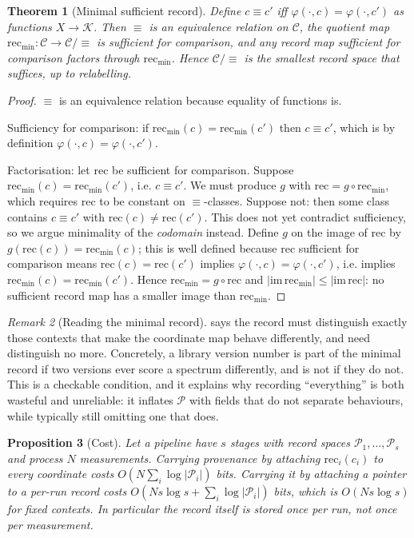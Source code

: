 \documentclass[11pt,a4paper]{article}
\newtheorem{theorem}{Theorem}[section]
\newtheorem{proposition}[theorem]{Proposition}
\theoremstyle{definition}
\theoremstyle{remark}
\newtheorem{remark}[theorem]{Remark}
\newcommand{\Crd}{\mathcal{K}}               %
\newcommand{\Ctx}{\mathcal{C}}               %
\newcommand{\Prv}{\mathcal{P}}               %
\newcommand{\rec}{\mathrm{rec}}
\begin{document}
\begin{theorem}[Minimal sufficient record]\label{thm:minimal-record}
Define $c \equiv c'$ iff $\varphi(\cdot,c) = \varphi(\cdot,c')$ as
functions $X \to \Crd$. Then $\equiv$ is an equivalence relation on
$\Ctx$, the quotient map $\rec_{\min} : \Ctx \to \Ctx/\!\equiv$ is
sufficient for comparison, and any record map sufficient for comparison
factors through $\rec_{\min}$. Hence $\Ctx/\!\equiv$ is the smallest
record space that suffices, up to relabelling.
\end{theorem}

\begin{proof}
$\equiv$ is an equivalence relation because equality of functions is.

Sufficiency for comparison: if $\rec_{\min}(c) = \rec_{\min}(c')$ then
$c \equiv c'$, which is by definition $\varphi(\cdot,c) =
\varphi(\cdot,c')$.

Factorisation: let $\rec$ be sufficient for comparison. Suppose
$\rec_{\min}(c) = \rec_{\min}(c')$, i.e. $c \equiv c'$. We must produce
$g$ with $\rec = g \circ \rec_{\min}$, which requires $\rec$ to be
constant on $\equiv$-classes. Suppose not: then some class contains
$c \equiv c'$ with $\rec(c) \neq \rec(c')$. This does not yet
contradict sufficiency, so we argue minimality of the \emph{codomain}
instead. Define $g$ on the image of $\rec$ by $g(\rec(c)) =
\rec_{\min}(c)$; this is well defined because $\rec$ sufficient for
comparison means $\rec(c) = \rec(c')$ implies $\varphi(\cdot,c) =
\varphi(\cdot,c')$, i.e. implies $\rec_{\min}(c) = \rec_{\min}(c')$.
Hence $\rec_{\min} = g \circ \rec$ and $|\mathrm{im}\,\rec_{\min}| \leq
|\mathrm{im}\,\rec|$: no sufficient record map has a smaller image than
$\rec_{\min}$.
\end{proof}

\begin{remark}[Reading the minimal record]\label{rem:minimal-reading}
 says the record must distinguish exactly those
contexts that make the coordinate map behave differently, and need
distinguish no more. Concretely, a library version number is part of the
minimal record if two versions ever score a spectrum differently, and is
not if they do not. This is a checkable condition, and it explains why
recording ``everything'' is both wasteful and unreliable: it inflates
$\Prv$ with fields that do not separate behaviours, while typically still
omitting one that does.
\end{remark}

\begin{proposition}[Cost]\label{prop:cost}
Let a pipeline have $s$ stages with record spaces $\Prv_1,\dots,\Prv_s$
and process $N$ measurements. Carrying provenance by attaching
$\rec_i(c_i)$ to every coordinate costs
$O\!\left(N \sum_i \log|\Prv_i|\right)$ bits. Carrying it by attaching a
pointer to a per-run record costs
$O\!\left(N s \log s + \sum_i \log|\Prv_i|\right)$ bits, which is
$O(Ns\log s)$ for fixed contexts. In particular the record itself is
stored once per run, not once per measurement.
\end{proposition}
\end{document}
